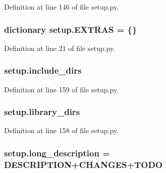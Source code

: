 Definition at line 146 of file setup.\+py.

\subsubsection[{\texorpdfstring{E\+X\+T\+R\+AS}{EXTRAS}}]{\setlength{\rightskip}{0pt plus 5cm}dictionary setup.\+E\+X\+T\+R\+AS = \{\}}\hypertarget{namespacesetup_aee28626b6df88b72de8654427de30a77}{}\label{namespacesetup_aee28626b6df88b72de8654427de30a77}


Definition at line 21 of file setup.\+py.

\subsubsection[{\texorpdfstring{include\+\_\+dirs}{include_dirs}}]{\setlength{\rightskip}{0pt plus 5cm}setup.\+include\+\_\+dirs}\hypertarget{namespacesetup_a52eaf4a217a97fb82180c1b16165017e}{}\label{namespacesetup_a52eaf4a217a97fb82180c1b16165017e}


Definition at line 159 of file setup.\+py.

\subsubsection[{\texorpdfstring{library\+\_\+dirs}{library_dirs}}]{\setlength{\rightskip}{0pt plus 5cm}setup.\+library\+\_\+dirs}\hypertarget{namespacesetup_a1f8901799e0c49c469161a6a4e79e759}{}\label{namespacesetup_a1f8901799e0c49c469161a6a4e79e759}


Definition at line 158 of file setup.\+py.

\subsubsection[{\texorpdfstring{long\+\_\+description}{long_description}}]{\setlength{\rightskip}{0pt plus 5cm}setup.\+long\+\_\+description = {\bf D\+E\+S\+C\+R\+I\+P\+T\+I\+ON}+{\bf C\+H\+A\+N\+G\+ES}+{\bf T\+O\+DO}}\hypertarget{namespacesetup_a4cda9dbfb952875376a0749fe08a5bde}{}\label{namespacesetup_a4cda9dbfb952875376a0749fe08a5bde}


